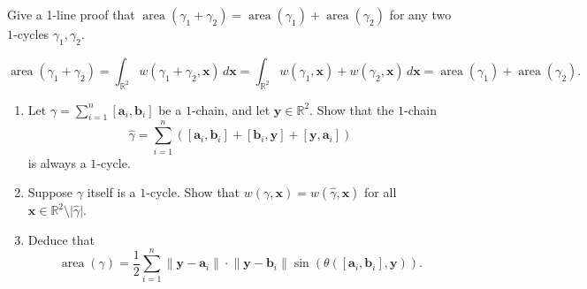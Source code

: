 \documentclass[12 pt, letterpaper]{hmcpset}
\begin{document}
\pagebreak

\begin{problem}[7.]
	Give a 1-line proof that $\operatorname{area}(\gamma_{1} + \gamma_{2}) = \operatorname{area}(\gamma_{1}) + \operatorname{area}(\gamma_{2})$ for any two $1$-cycles $\gamma_{1}, \gamma_{2}$.
\end{problem}

\begin{solution}
	\[
		\operatorname{area}(\gamma_{1} + \gamma_{2}) = \int_{\mathbb{R}^{2}} w(\gamma_{1} + \gamma_{2}, \mathbf{x}) \, d\mathbf{x} = \int_{\mathbb{R}^{2}} w(\gamma_{1}, \mathbf{x}) + w(\gamma_{2}, \mathbf{x}) \, d\mathbf{x} = \operatorname{area}(\gamma_{1}) + \operatorname{area}(\gamma_{2}).
	\]
\end{solution}

\pagebreak

\begin{problem}[8.]
	\begin{enumerate}
		\item Let $\gamma = \sum_{i = 1}^{n} [\mathbf{a}_{i}, \mathbf{b}_{i}]$ be a $1$-chain, and let $\mathbf{y} \in \mathbb{R}^{2}$. Show that the $1$-chain
			\[
				\hat{\gamma} = \sum_{i = 1}^{n} ([\mathbf{a}_{i}, \mathbf{b}_{i}] + [\mathbf{b}_{i}, \mathbf{y}] + [\mathbf{y}, \mathbf{a}_{i}])
			\]
			is always a $1$-cycle.
		\item Suppose $\gamma$ itself is a $1$-cycle. Show that $w(\gamma, \mathbf{x}) = w(\hat{\gamma}, \mathbf{x})$ for all $\mathbf{x} \in \mathbb{R}^{2} \setminus \lvert \hat{\gamma} \rvert$.
		\item Deduce that
			\[
				\operatorname{area}(\gamma) = \frac{1}{2} \sum_{i = 1}^{n}  \lVert \mathbf{y} - \mathbf{a}_{i} \rVert \cdot \lVert \mathbf{y} - \mathbf{b}_{i} \rVert \sin{(\theta([\mathbf{a}_{i}, \mathbf{b}_{i}], \mathbf{y}))}.
			\]
	\end{enumerate}
\end{problem}
\end{document}
